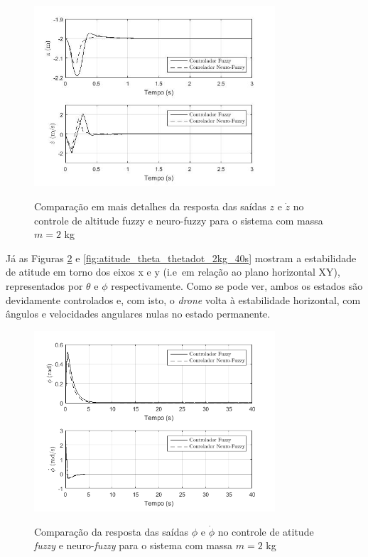 \begin{figure}[!htb]
    \centering
    \caption{Comparação em mais detalhes da resposta das saídas $z$ e $\dot{z}$ no controle de altitude fuzzy e neuro-fuzzy para o sistema com massa $m=2$ kg}
    \includegraphics[width=0.8\textwidth]{./04-figuras/figuras_pos_banca/5-altitude2kg/graph_z_zdot_2kg_details}
    \label{fig:altitude_z_zdot_2kg_closer}
\end{figure}


Já as Figuras \ref{fig:atitude_phi_phidot_2kg_40s} e \ref{fig:atitude_theta_thetadot_2kg_40s} mostram a estabilidade de atitude em torno dos eixos x e y (i.e\ em relação ao plano horizontal XY), representados por $\theta$ e $\phi$ respectivamente. Como se pode ver, ambos os estados são devidamente controlados e, com isto, o \textit{drone} volta à estabilidade horizontal, com ângulos e velocidades angulares nulas no estado permanente.

\begin{figure}[!htb]
    \centering
    \caption{Comparação da resposta das saídas $\phi$ e $\dot{\phi}$ no controle de atitude \textit{fuzzy} e neuro-\textit{fuzzy} para o sistema com massa $m=2$ kg}
    \includegraphics[width=0.8\textwidth]{./04-figuras/resultados/novos/atitude_phi_phidot_2kg_40s}
    \label{fig:atitude_phi_phidot_2kg_40s}
\end{figure}

